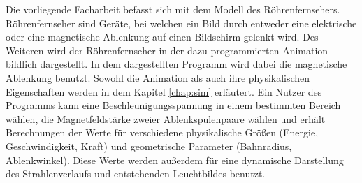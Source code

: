 Die vorliegende Facharbeit befasst sich mit dem Modell des Röhrenfernsehers.
Röhrenfernseher sind Geräte, bei welchen ein Bild durch entweder eine elektrische oder eine magnetische Ablenkung auf einen Bildschirm gelenkt wird.
Des Weiteren wird der Röhrenfernseher in der dazu programmierten Animation bildlich dargestellt.
In dem dargestellten Programm wird dabei die magnetische Ablenkung benutzt.
Sowohl die Animation als auch ihre physikalischen Eigenschaften werden in dem Kapitel \ref{chap:sim} erläutert.
Ein Nutzer des Programms kann eine Beschleunigungsspannung in einem bestimmten Bereich wählen, die Magnetfeldstärke zweier Ablenkspulenpaare wählen und erhält Berechnungen der Werte für verschiedene physikalische Größen (Energie, Geschwindigkeit, Kraft) und geometrische Parameter (Bahnradius, Ablenkwinkel).
Diese Werte werden außerdem für eine dynamische Darstellung des Strahlenverlaufs und entstehenden Leuchtbildes benutzt.

